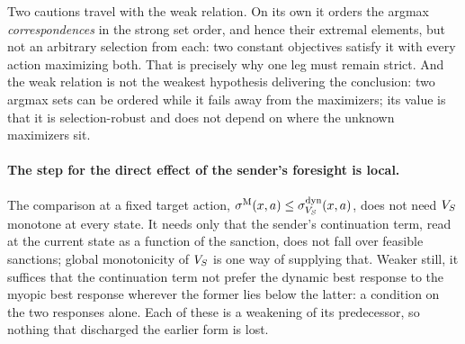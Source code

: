 Two cautions travel with the weak relation. On its own it orders the argmax
\emph{correspondences} in the strong set order, and hence their extremal
elements, but not an arbitrary selection from each: two constant objectives
satisfy it with every action maximizing both. That is precisely why one leg must
remain strict. And the weak relation is not the weakest hypothesis delivering the
conclusion: two argmax sets can be ordered while it fails away from the
maximizers; its value is that it is selection-robust and does not depend on where
the unknown maximizers sit.

\paragraph{The step for the direct effect of the sender's foresight is local.}
The comparison at a fixed target action, $\sigma^{\mathrm{M}}(x,a)\le\sigma^{\mathrm{dyn}}_{V_S}(x,a)$, does not need
$V_S$ monotone at every state. It needs only that the sender's continuation term,
read at the current state as a function of the sanction, does not fall over
feasible sanctions; global monotonicity of $V_S$ is one way of supplying that.
Weaker still, it suffices that the continuation term not prefer the
dynamic best response to the myopic best response wherever the former lies
below the latter: a condition on the two responses alone. Each of these is a weakening of
its predecessor, so nothing that discharged the earlier form is lost.
